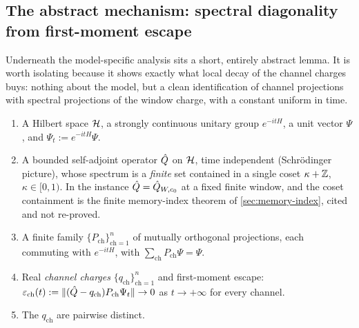 
\subsection{The abstract mechanism: spectral diagonality from first-moment escape}
\label{subsec:spectral-diagonality}

Underneath the model-specific analysis sits a short, entirely abstract lemma.
It is worth isolating because it shows exactly what local decay of the channel
charges buys: nothing about the model, but a clean identification of channel
projections with spectral projections of the window charge, with a constant
uniform in time.

\begin{definition}
\label{def:a1-a5}
\begin{enumerate}
\item[(A1)] A Hilbert space $\mathcal{H}$, a strongly continuous unitary group
$e^{-itH}$, a unit vector $\Psi$, and $\Psi_t:=e^{-itH}\Psi$.
\item[(A2)] A bounded self-adjoint operator $\hat{Q}$ on $\mathcal{H}$, time
independent (Schr\"odinger picture), whose spectrum is a \emph{finite} set
contained in a single coset $\kappa+\mathbb{Z}$, $\kappa\in[0,1)$. In the instance
$\hat{Q}=\hat{Q}_{W,c_0}$ at a fixed finite window, and the coset containment is
the finite memory-index theorem of \cref{sec:memory-index}, cited and not
re-proved.
\item[(A3)] A finite family $\{P_{\mathrm{ch}}\}_{\mathrm{ch}=1}^{n}$ of
mutually orthogonal projections, each commuting with $e^{-itH}$, with
$\sum_{\mathrm{ch}}P_{\mathrm{ch}}\Psi=\Psi$.
\item[(A4)] Real \emph{channel charges}
$\{q_{\mathrm{ch}}\}_{\mathrm{ch}=1}^{n}$ and first-moment escape:
$\varepsilon_{\mathrm{ch}}(t):=
\lVert (\hat{Q}-q_{\mathrm{ch}})P_{\mathrm{ch}}\Psi_t\rVert\to0$ as $t\to+\infty$ for
every channel.
\item[(A5)] The $q_{\mathrm{ch}}$ are pairwise distinct.
\end{enumerate}
\end{definition}

